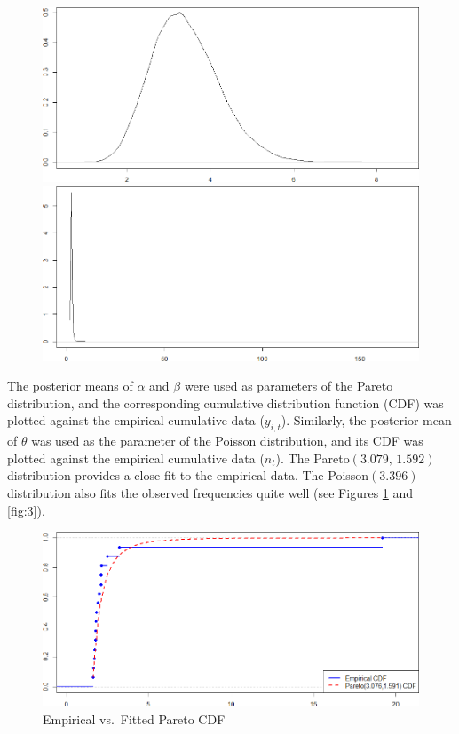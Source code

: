 \documentclass{Class/julia}
\begin{document}
\begin{figure}[!ht]
    \begin{minipage}{0.45\textwidth}
        \centering
        \includegraphics[width=\textwidth]{rytgaard1990/density_theta.png}
        \subcaption{\( \theta \)}
    \end{minipage}%
    \hfill
    \begin{minipage}{0.45\textwidth}
        \centering
        \includegraphics[width=\textwidth]{rytgaard1990/density_E_y.png}
    \end{minipage}
    
\end{figure}

The posterior means of \( \alpha \) and \( \beta \) were used as parameters of the Pareto distribution, and the corresponding cumulative distribution function (CDF) was plotted against the empirical cumulative data (\( y_{i,t} \)). Similarly, the posterior mean of \( \theta \) was used as the parameter of the Poisson distribution, and its CDF was plotted against the empirical cumulative data (\( n_t \)). The Pareto\((3.079,\,1.592)\) distribution provides a close fit to the empirical data. The Poisson\((3.396)\) distribution also fits the observed frequencies quite well (see Figures \ref{fig:2} and \ref{fig:3}).

\begin{figure}[!ht]
    \centering
    \caption{Empirical vs.\ Fitted Pareto CDF}
    \label{fig:2}
    \includegraphics[width=.5\textwidth]{rytgaard1990/empirical_vs_pareto.png}
\end{figure}
\end{document}
